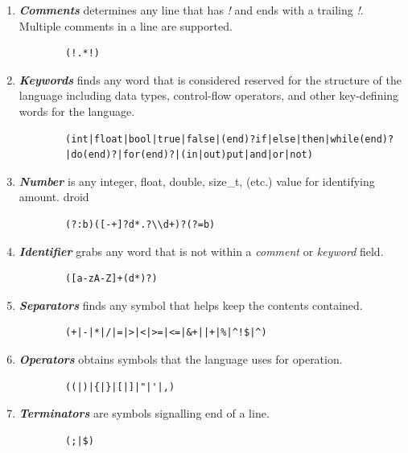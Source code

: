 \documentclass{article}
\begin{document}
        \begin{enumerate}

            \item \emph{\textbf{Comments}} determines any line that has \emph{!} and ends with a trailing \emph{!}. Multiple comments in a line are supported.
            \begin{Verbatim}
        (!.*!)
            \end{Verbatim}
            
            \item \emph{\textbf{Keywords}} finds any word that is considered reserved for the structure of the language including data types, control-flow operators, and other key-defining words for the language.  
            \begin{Verbatim}
        (int|float|bool|true|false|(end)?if|else|then|while(end)?
        |do(end)?|for(end)?|(in|out)put|and|or|not)
            \end{Verbatim}
            
            \item \emph{\textbf{Number}} is any integer, float, double, size\_t, (etc.) value for identifying amount. 
            droid
            \begin{Verbatim}
        (?:b)([-+]?d*.?\\d+)?(?=b)
            \end{Verbatim}

            \item \emph{\textbf{Identifier}} grabs any word that is not within a \emph{comment} or \emph{keyword} field.
            \begin{Verbatim}
        ([a-zA-Z]+(d*)?) 
            \end{Verbatim}
            
            \item \emph{\textbf{Separators}} finds any symbol that helps keep the contents contained.
            \begin{Verbatim}
        (+|-|*|/|=|>|<|>=|<=|&+||+|%|^!$|^)
            \end{Verbatim}
            
            \item \emph{\textbf{Operators}} obtains symbols that the language uses for operation.
            \begin{Verbatim}
        ((|)|{|}|[|]|"|'|,)
            \end{Verbatim}
           
            \item \emph{\textbf{Terminators}} are symbols signalling end of a line.
            \begin{Verbatim}
        (;|$) 
            \end{Verbatim}

        \end{enumerate}
\end{document}
